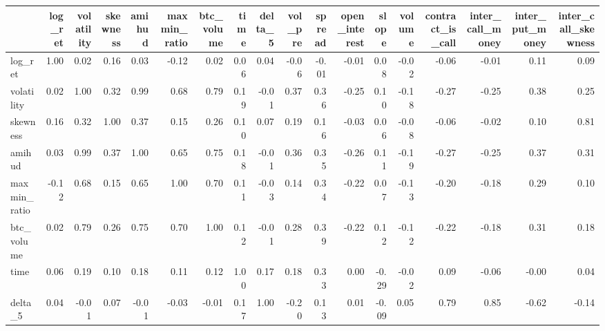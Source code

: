 \begin{tabular}{lrrrrrrrrrrrrrrrrr}
\toprule
{} &  log\_ret &  volatility &  skewness &  amihud &  maxmin\_ratio &  btc\_volume &  time &  delta\_5 &  vol\_pre &  spread &  open\_interest &  slope &  volume &  contract\_is\_call &  inter\_call\_money &  inter\_put\_money &  inter\_call\_skewness \\
\midrule
log\_ret             &     1.00 &        0.02 &      0.16 &    0.03 &         -0.12 &        0.02 &  0.06 &     0.04 &    -0.06 &   -0.01 &          -0.01 &   0.08 &   -0.02 &             -0.06 &             -0.01 &             0.11 &                 0.09 \\
volatility          &     0.02 &        1.00 &      0.32 &    0.99 &          0.68 &        0.79 &  0.19 &    -0.01 &     0.37 &    0.36 &          -0.25 &   0.10 &   -0.18 &             -0.27 &             -0.25 &             0.38 &                 0.25 \\
skewness            &     0.16 &        0.32 &      1.00 &    0.37 &          0.15 &        0.26 &  0.10 &     0.07 &     0.19 &    0.16 &          -0.03 &   0.06 &   -0.08 &             -0.06 &             -0.02 &             0.10 &                 0.81 \\
amihud              &     0.03 &        0.99 &      0.37 &    1.00 &          0.65 &        0.75 &  0.18 &    -0.01 &     0.36 &    0.35 &          -0.26 &   0.11 &   -0.19 &             -0.27 &             -0.25 &             0.37 &                 0.31 \\
maxmin\_ratio        &    -0.12 &        0.68 &      0.15 &    0.65 &          1.00 &        0.70 &  0.11 &    -0.03 &     0.14 &    0.34 &          -0.22 &   0.07 &   -0.13 &             -0.20 &             -0.18 &             0.29 &                 0.10 \\
btc\_volume          &     0.02 &        0.79 &      0.26 &    0.75 &          0.70 &        1.00 &  0.12 &    -0.01 &     0.28 &    0.39 &          -0.22 &   0.12 &   -0.12 &             -0.22 &             -0.18 &             0.31 &                 0.18 \\
time                &     0.06 &        0.19 &      0.10 &    0.18 &          0.11 &        0.12 &  1.00 &     0.17 &     0.18 &    0.33 &           0.00 &  -0.29 &   -0.02 &              0.09 &             -0.06 &            -0.00 &                 0.04 \\
delta\_5             &     0.04 &       -0.01 &      0.07 &   -0.01 &         -0.03 &       -0.01 &  0.17 &     1.00 &    -0.20 &    0.13 &           0.01 &  -0.09 &    0.05 &              0.79 &              0.85 &            -0.62 &                -0.14 \\

\end{tabular}
